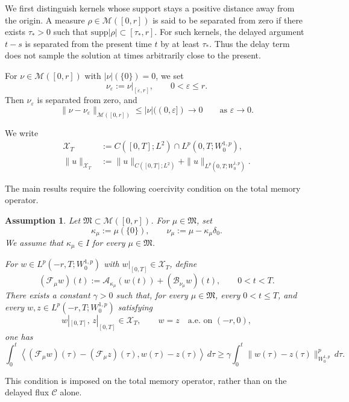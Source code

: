 \documentclass[a4paper,11pt,oneside,reqno]{amsart}
\newtheorem{assumption}[theorem]{Assumption}
\newcounter{c}
\newcounter{d}
\newcounter{b}
\newcommand{\e}{\varepsilon}
\newcommand{\supp}{\mathrm{supp}}
\newcommand{\dual}[2]{\left\langle #1,#2\right\rangle}
\newcommand{\M}{\mathcal{M}}
\newcommand{\KM}{\mathfrak{M}}
\begin{document}
We first distinguish kernels whose support stays a positive distance away
from the origin. A measure $\rho\in\M([0,r])$ is said to be separated from
zero if there exists $\tau_*>0$ such that $\supp|\rho|\subset[\tau_*,r]$.
For such kernels, the delayed argument $t-s$ is separated from the present
time $t$ by at least $\tau_*$. Thus the delay term does not sample the
solution at times arbitrarily close to the present. 

For $\nu\in\M([0,r])$ with $|\nu|(\{0\})=0$, we set
\begin{equation}
 \nu_\e:=\nu|_{[\e,r]},
 \qquad 0<\e\le r.
 \label{eq:nu-eps-def}
\end{equation}
Then $\nu_\e$ is separated from zero, and
\[
 \|\nu-\nu_\e\|_{\M([0,r])}
 \le |\nu|((0,\e])\to0
 \qquad\text{as }\e\to 0.
\]


We write
\[
\begin{aligned}
 \mathcal X_T
 &:=
 C([0,T];L^2)\cap L^p(0,T;W^{1,p}_0),\\
 \|u\|_{\mathcal X_T}
 &:=
 \|u\|_{C([0,T];L^2)}
 +\|u\|_{L^p(0,T;W^{1,p}_0)}.
\end{aligned}
\]

The main results require the following coercivity condition on the total
memory operator.

\begin{assumption}\label{ass:pathwise-coercivity}
Let $\KM\subset \M([0,r])$. For $\mu\in\KM$, set
\[
 \kappa_\mu:=\mu(\{0\}),\qquad
 \nu_\mu:=\mu-\kappa_\mu\delta_0 .
\]
We assume that $\kappa_\mu\in I$ for every $\mu\in\KM$.

For $w\in L^p(-r,T;W^{1,p}_0)$ with $w|_{[0,T]}\in\mathcal X_T$, define
\[
 (\mathcal F_\mu w)(t)
 :=
 \mathcal A_{\kappa_\mu}(w(t))
 +
 (\mathcal B_{\nu_\mu}w)(t),
 \qquad 0<t<T.
\]
There exists a constant $\gamma>0$ such that, for every
$\mu\in\KM$, every $0<t\le T$, and every
$w,z\in L^p(-r,T;W^{1,p}_0)$ satisfying
\[
 w|_{[0,T]},\,z|_{[0,T]}\in\mathcal X_T,
 \qquad
 w=z \quad\text{a.e. on }(-r,0),
\]
one has
\begin{equation}
\int_0^t
\dual{
 (\mathcal F_\mu w)(\tau)-(\mathcal F_\mu z)(\tau)
}{
 w(\tau)-z(\tau)
}
\,d\tau
\ge
\gamma
\int_0^t
\|w(\tau)-z(\tau)\|_{W^{1,p}_0}^p\,d\tau .
\label{eq:pathwise-coercivity}
\end{equation}
\end{assumption}

This condition is imposed on the total memory operator, rather than on the
delayed flux \(\mathcal C\) alone.
\end{document}
